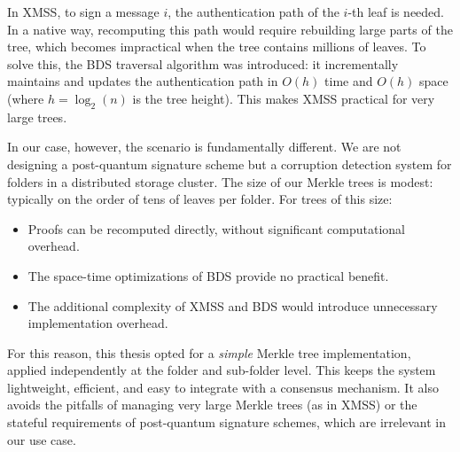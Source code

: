 In XMSS, to sign a message $i$, the authentication path of the $i$-th leaf is needed. In a native way, recomputing this path would require rebuilding large parts of the tree, which becomes impractical when the tree contains millions of leaves. To solve this, the BDS traversal algorithm was introduced: it incrementally maintains and updates the authentication path in $O(h)$ time and $O(h)$ space (where $h = \log_2(n)$ is the tree height). This makes XMSS practical for very large trees.

In our case, however, the scenario is fundamentally different. We are not designing a post-quantum signature scheme but a corruption detection system for folders in a distributed storage cluster. The size of our Merkle trees is modest: typically on the order of tens of leaves per folder. For trees of this size:
\begin{itemize}
    \item Proofs can be recomputed directly, without significant computational overhead.
    \item The space-time optimizations of BDS provide no practical benefit.
    \item The additional complexity of XMSS and BDS would introduce unnecessary implementation overhead.
\end{itemize}

For this reason, this thesis opted for a \emph{simple} Merkle tree implementation, applied independently at the folder and sub-folder level. This keeps the system lightweight, efficient, and easy to integrate with a consensus mechanism. It also avoids the pitfalls of managing very large Merkle trees (as in XMSS) or the stateful requirements of post-quantum signature schemes, which are irrelevant in our use case.


